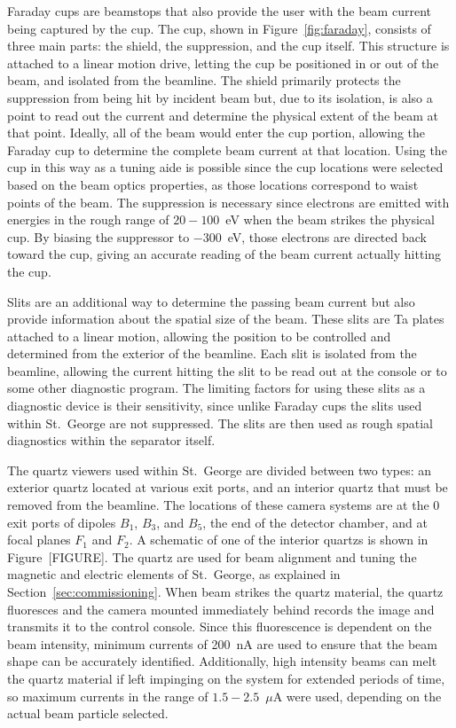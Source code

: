 Faraday cups are beamstops that also provide the user with the beam
current being captured by the cup. The cup, shown in
Figure~\ref{fig:faraday}, consists of three main parts: the shield, the
suppression, and the cup itself. This structure is attached to a linear
motion drive, letting the cup be positioned in or out of the beam, and
isolated from the beamline. The shield primarily protects the
suppression from being hit by incident beam but, due to its isolation,
is also a point to read out the current and determine the physical
extent of the beam at that point. Ideally, all of the beam would enter
the cup portion, allowing the Faraday cup to determine the complete beam
current at that location. Using the cup in this way as a tuning aide is
possible since the cup locations were selected based on the beam optics
properties, as those locations correspond to waist points of the beam.
The suppression is necessary since electrons are emitted with energies
in the rough range of $20-100$~eV when the beam strikes the physical
cup. By biasing the suppressor to $-300$~eV, those electrons are
directed back toward the cup, giving an accurate reading of the beam
current actually hitting the cup.

Slits are an additional way to determine the passing beam current but
also provide information about the spatial size of the beam. These slits
are Ta plates attached to a linear motion, allowing the position to be
controlled and determined from the exterior of the beamline. Each slit
is isolated from the beamline, allowing the current hitting the slit to
be read out at the console or to some other diagnostic program. The
limiting factors for using these slits as a diagnostic device is their
sensitivity, since unlike Faraday cups the slits used within St.\ George
are not suppressed. The slits are then used as rough spatial diagnostics
within the separator itself.

The quartz viewers used within St.\ George are divided between two
types: an exterior quartz located at various exit ports, and an interior
quartz that must be removed from the beamline. The locations of these
camera systems are at the 0\degree{} exit ports of dipoles $B_1$, $B_3$,
and $B_5$, the end of the detector chamber, and at focal planes $F_1$
and $F_2$. A schematic of one of the interior quartzs is shown in
Figure~[FIGURE]. The quartz are used for beam alignment and tuning the
magnetic and electric elements of St.\ George, as explained in
Section~\ref{sec:commissioning}. When beam strikes the quartz material,
the quartz fluoresces and the camera mounted immediately behind records
the image and transmits it to the control console. Since this
fluorescence is dependent on the beam intensity, minimum currents of
200~nA are used to ensure that the beam shape can be accurately
identified. Additionally, high intensity beams can melt the quartz
material if left impinging on the system for extended periods of time,
so maximum currents in the range of $1.5-2.5$~$\mu$A were used,
depending on the actual beam particle selected.



